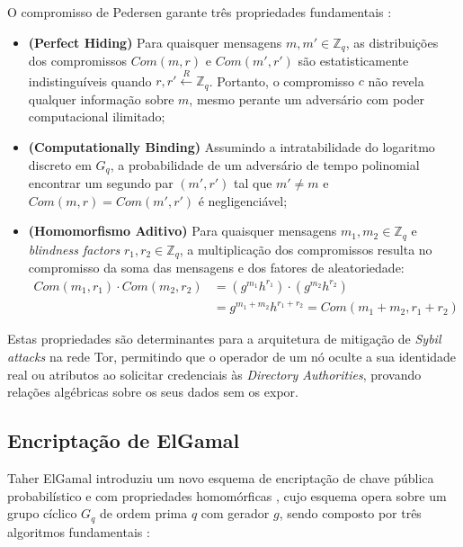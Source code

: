 O compromisso de Pedersen garante três propriedades fundamentais \cite{pedersen1991noninteractive}:

\begin{itemize}
    \item \textbf{(Perfect Hiding)} Para quaisquer mensagens $m, m' \in \mathbb{Z}_q$, as distribuições dos compromissos $Com(m,r)$ e $Com(m',r')$ são estatisticamente indistinguíveis quando $r,r' \xleftarrow{R} \mathbb{Z}_q$. Portanto, o compromisso $c$ não revela qualquer informação sobre $m$, mesmo perante um adversário com poder computacional ilimitado;
    \item \textbf{(Computationally Binding)} Assumindo a intratabilidade do logaritmo discreto em $G_q$, a probabilidade de um adversário de tempo polinomial encontrar um segundo par $(m',r')$ tal que $m' \neq m$ e $Com(m,r) = Com(m',r')$ é negligenciável;
    \item \textbf{(Homomorfismo Aditivo)} Para quaisquer mensagens $m_1, m_2 \in \mathbb{Z}_q$ e \textit{blindness factors} $r_1, r_2 \in \mathbb{Z}_q$, a multiplicação dos compromissos resulta no compromisso da soma das mensagens e dos fatores de aleatoriedade:
    \begin{align*}
        Com(m_1, r_1) \cdot Com(m_2, r_2) &= (g^{m_1}h^{r_1}) \cdot (g^{m_2}h^{r_2}) \\
        &= g^{m_1+m_2}h^{r_1+r_2} = Com(m_1+m_2, r_1+r_2)
    \end{align*}
\end{itemize}

Estas propriedades são determinantes para a arquitetura de mitigação de \textit{Sybil attacks} na rede Tor, permitindo que o operador de um nó oculte a sua identidade real ou atributos ao solicitar credenciais às \textit{Directory Authorities}, provando relações algébricas sobre os seus dados sem os expor.

\subsection{Encriptação de ElGamal}

Taher ElGamal \cite{elgamal1985public} introduziu um novo esquema de encriptação de chave pública probabilístico e com propriedades homomórficas \cite{brandt2005efficient}, cujo esquema opera sobre um grupo cíclico $G_q$ de ordem prima $q$ com gerador $g$, sendo composto por três algoritmos fundamentais \cite{crites2025syra}:

